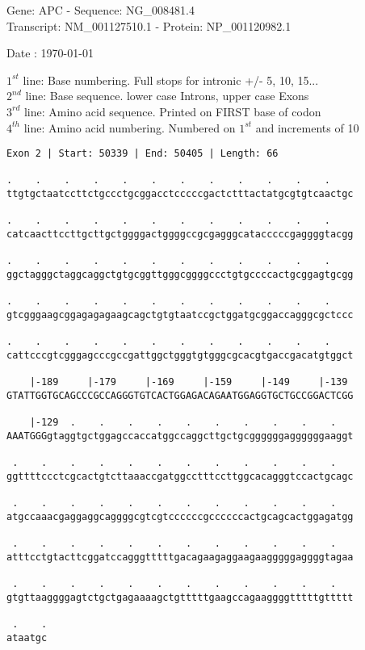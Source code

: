 \documentclass{article}
\begin{document}
\begin{center}
\begin{large}
Gene: APC - Sequence: NG\_008481.4\\
Transcript: NM\_001127510.1 - Protein: NP\_001120982.1
 
 Date : \today
\end{large}
\end{center}
$1^{st}$ line: Base numbering. Full stops for intronic +/- 5, 10, 15...\\
$2^{nd}$ line: Base sequence. lower case Introns, upper case Exons\\
$3^{rd}$ line: Amino acid sequence. Printed on FIRST base of codon\\
$4^{th}$ line: Amino acid numbering. Numbered on $1^{st}$ and increments of 10\\
\begin{Verbatim}[fontfamily=courier]
Exon 2 | Start: 50339 | End: 50405 | Length: 66

.    .    .    .    .    .    .    .    .    .    .    .    
ttgtgctaatccttctgccctgcggacctcccccgactctttactatgcgtgtcaactgc

.    .    .    .    .    .    .    .    .    .    .    .    
catcaacttccttgcttgctggggactggggccgcgagggcatacccccgaggggtacgg

.    .    .    .    .    .    .    .    .    .    .    .    
ggctagggctaggcaggctgtgcggttgggcggggccctgtgccccactgcggagtgcgg

.    .    .    .    .    .    .    .    .    .    .    .    
gtcgggaagcggagagagaagcagctgtgtaatccgctggatgcggaccagggcgctccc

.    .    .    .    .    .    .    .    .    .    .    .    
cattcccgtcgggagcccgccgattggctgggtgtgggcgcacgtgaccgacatgtggct

    |-189     |-179     |-169     |-159     |-149     |-139 
GTATTGGTGCAGCCCGCCAGGGTGTCACTGGAGACAGAATGGAGGTGCTGCCGGACTCGG

    |-129  .    .    .    .    .    .    .    .    .    .   
AAATGGGgtaggtgctggagccaccatggccaggcttgctgcggggggaggggggaaggt

 .    .    .    .    .    .    .    .    .    .    .    .   
ggttttccctcgcactgtcttaaaccgatggcctttccttggcacagggtccactgcagc

 .    .    .    .    .    .    .    .    .    .    .    .   
atgccaaacgaggaggcaggggcgtcgtccccccgccccccactgcagcactggagatgg

 .    .    .    .    .    .    .    .    .    .    .    .   
atttcctgtacttcggatccagggtttttgacagaagaggaagaagggggaggggtagaa

 .    .    .    .    .    .    .    .    .    .    .    .   
gtgttaaggggagtctgctgagaaaagctgtttttgaagccagaaggggtttttgttttt

 .    .
ataatgc
\end{Verbatim}
\end{document}
